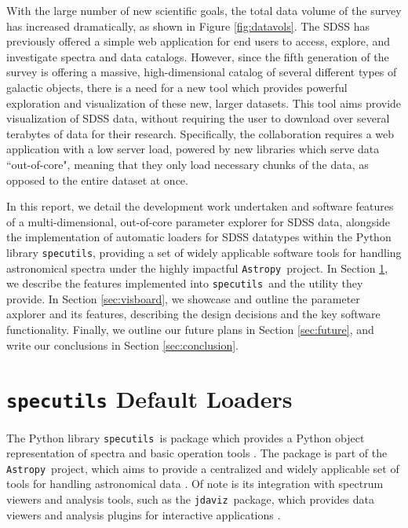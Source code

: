 \documentclass[a4paper,10pt,twocolumn]{article}
\newcommand{\specutils}{\texttt{specutils}}
\newcommand{\jdaviz}{\texttt{jdaviz}}
\begin{document}
With the large number of new scientific goals, the total data volume of the survey has increased dramatically, as shown in Figure \ref{fig:datavols}. The SDSS has previously offered a simple web application for end users to access, explore, and investigate spectra and data catalogs. However, since the fifth generation of the survey is offering a massive, high-dimensional catalog of several different types of galactic objects, there is a need for a new tool which provides powerful exploration and visualization of these new, larger datasets. This tool aims provide visualization of SDSS data, without requiring the user to download over several terabytes of data for their research. Specifically, the collaboration requires a web application with a low server load, powered by new libraries which serve data ``out-of-core", meaning that they only load necessary chunks of the data, as opposed to the entire dataset at once.

In this report, we detail the development work undertaken and software features of a multi-dimensional, out-of-core parameter explorer for SDSS data, alongside the implementation of automatic loaders for SDSS datatypes within the Python library \texttt{specutils}, providing a set of widely applicable software tools for handling astronomical spectra under the highly impactful \texttt{Astropy}\, project. In Section \ref{sec:specutils}, we describe the features implemented into \specutils\, and the utility they provide. In Section \ref{sec:visboard}, we showcase and outline the parameter axplorer and its features, describing the design decisions and the key software functionality. Finally, we outline our future plans in Section \ref{sec:future}, and write our conclusions in Section \ref{sec:conclusion}.


\section{\texttt{specutils} Default Loaders}
\label{sec:specutils}
The Python library \specutils\, is package which provides a Python object representation of spectra and basic operation tools \parencite{specutils}. The package is part of the \texttt{Astropy}\, project, which aims to provide a centralized and widely applicable set of tools for handling astronomical data \parencite{astropyarticle}. Of note is its integration with spectrum viewers and analysis tools, such as the \jdaviz\, package, which provides data viewers and analysis plugins for interactive applications \parencite{jdaviz}.
\end{document}
